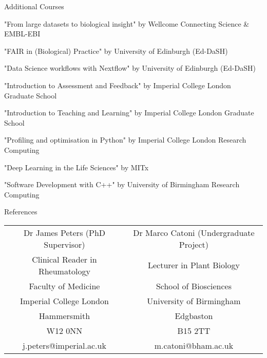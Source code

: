 \documentclass{resume}
\begin{document}
\begin{rSection}{Additional Courses}

\item "From large datasets to biological insight" by Wellcome Connecting Science \& EMBL-EBI
\vspace{2pt plus 1pt minus 1pt}

\item "FAIR in (Biological) Practice" by University of Edinburgh (Ed-DaSH)
\vspace{2pt plus 1pt minus 1pt}

\item "Data Science workflows with Nextflow" by University of Edinburgh (Ed-DaSH)
\vspace{2pt plus 1pt minus 1pt}

\item "Introduction to Assessment and Feedback" by Imperial College London Graduate School
\vspace{2pt plus 1pt minus 1pt}

\item "Introduction to Teaching and Learning" by Imperial College London Graduate School
\vspace{2pt plus 1pt minus 1pt}

\item "Profiling and optimisation in Python" by Imperial College London Research Computing
\vspace{2pt plus 1pt minus 1pt}

\item "Deep Learning in the Life Sciences" by MITx
\vspace{2pt plus 1pt minus 1pt}

\item "Software Development with C++" by University of Birmingham Research Computing
\vspace{2pt plus 1pt minus 1pt}

\end{rSection}
\begin{rSection}{References}

\begin{center}
\begin{tabular}{c@{\hskip 0.75in}c} 

 Dr James Peters (PhD Supervisor) & Dr Marco Catoni (Undergraduate Project) \\ 
 Clinical Reader in Rheumatology & Lecturer in Plant Biology \\ 
 Faculty of Medicine & School of Biosciences \\ 
 Imperial College London & University of Birmingham \\ 
 Hammersmith & Edgbaston \\ 
 W12 0NN & B15 2TT \\ 
 j.peters@imperial.ac.uk & m.catoni@bham.ac.uk \\ 
\end{tabular}
\end{center}

\end{rSection}
\end{document}
